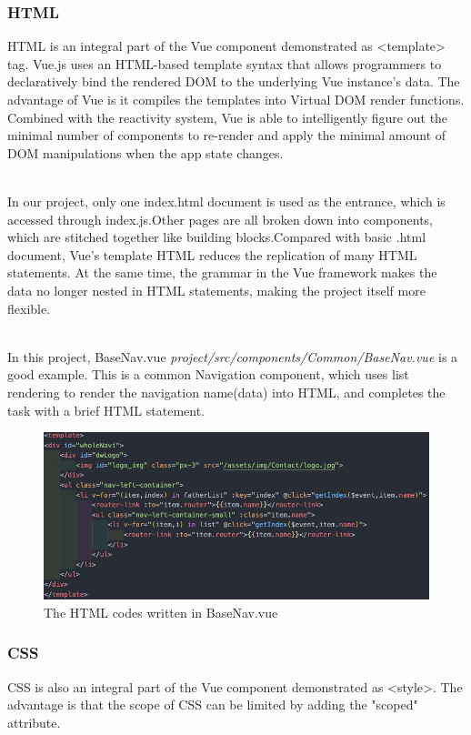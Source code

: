 \documentclass{article}
\begin{document}
\subsubsection{HTML}
HTML is an integral part of the Vue component demonstrated as \textless template\textgreater \space
tag. 
Vue.js uses an HTML-based template syntax that allows programmers to declaratively 
bind the rendered DOM to the underlying Vue instance’s data. The advantage of Vue 
is it compiles the templates into Virtual DOM render functions. Combined with the 
reactivity system, Vue is able to intelligently figure out the minimal number of 
components to re-render and apply the minimal amount of DOM manipulations when the 
app state changes.

~\\
\noindent
In our project, only one index.html document is used as the entrance, which is 
accessed through index.js.Other pages are all broken down into components, 
which are stitched together like building blocks.Compared with basic .html 
document, Vue's template HTML reduces the replication of many HTML statements. 
At the same time, the grammar in the Vue framework makes the data no longer 
nested in HTML statements, making the project itself more flexible.

~\\
\noindent
In this project, BaseNav.vue \textit{project/src/components/Common/BaseNav.vue}
is a good example. This is a common Navigation component, which uses list 
rendering to render the navigation name(data) into HTML, and completes 
the task with a brief HTML statement.

\begin{figure}[h]
    \centering
    \includegraphics[width=13cm]{img/exp/html.png}
    \caption{The HTML codes written in BaseNav.vue}
    \label{}
\end{figure}
\subsubsection{CSS}
CSS is also an integral part of the Vue component demonstrated 
as \textless style\textgreater. The advantage is that the scope of CSS can be 
limited by adding the "scoped" attribute.
\end{document}

